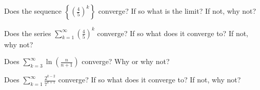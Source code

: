 \documentclass{exam}[12pt]
\begin{document}
\pagestyle{head}

\extraheadheight{.3in}
\extrafootheight{-.3in} 


\vspace{.2in}
\large{
\begin{questions}

\question Does the sequence $\displaystyle
\left\{\left(\frac{4}{5}\right)^k\right\}$ converge?
If so what is the limit?  If not, why not?

\vspace{.7in}
\question Does the series $\displaystyle
\sum_{k=1}^\infty\left(\frac{4}{5}\right)^k$ converge?
If so what does it converge to?  If not, why not?
\vspace{1.5in}


\question Does $\displaystyle
\sum_{k=3}^\infty \ln\left(\frac{n}{n+1}\right)$ converge?
Why or why not?
\vspace{2.8in}

\question Does  $\displaystyle
\sum_{k=1}^\infty \frac{2^{k-2}}{7^{k+1}} $ converge?
If so what does it converge to?  If not, why not?


\end{questions}

}
\end{document}
